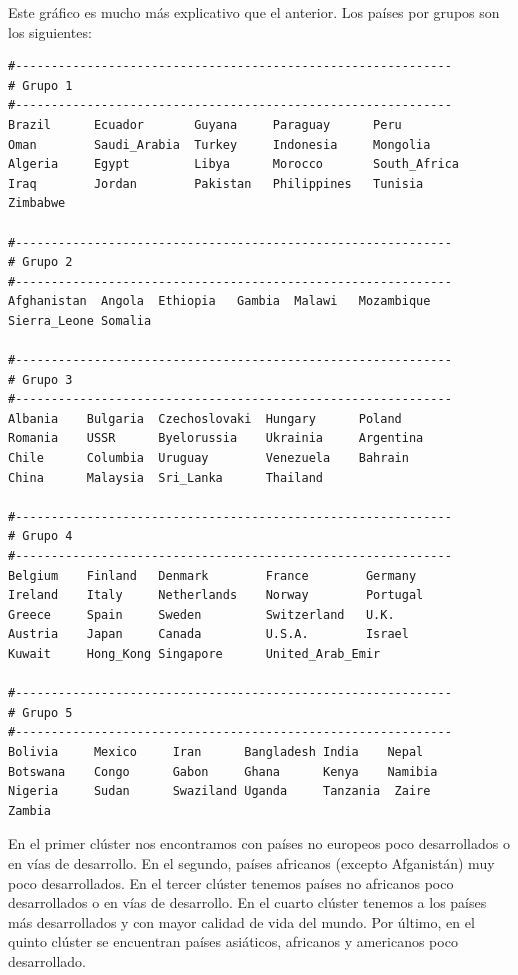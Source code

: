 \documentclass[12pt,a4paper,twoside,openright,titlepage,final]{article}
\begin{document}
Este gráfico es mucho más explicativo que el anterior. Los países por grupos son los siguientes:

\begin{verbatim}
#-------------------------------------------------------------
# Grupo 1
#-------------------------------------------------------------
Brazil      Ecuador       Guyana     Paraguay      Peru         
Oman        Saudi_Arabia  Turkey     Indonesia     Mongolia     
Algeria     Egypt         Libya      Morocco       South_Africa 
Iraq        Jordan        Pakistan   Philippines   Tunisia    
Zimbabwe 

#-------------------------------------------------------------
# Grupo 2
#-------------------------------------------------------------
Afghanistan  Angola  Ethiopia   Gambia  Malawi   Mozambique 
Sierra_Leone Somalia 

#-------------------------------------------------------------
# Grupo 3
#-------------------------------------------------------------
Albania    Bulgaria  Czechoslovaki  Hungary      Poland       
Romania    USSR      Byelorussia    Ukrainia     Argentina         
Chile      Columbia  Uruguay        Venezuela    Bahrain         
China      Malaysia  Sri_Lanka      Thailand 

#-------------------------------------------------------------
# Grupo 4
#-------------------------------------------------------------
Belgium    Finland   Denmark        France        Germany           
Ireland    Italy     Netherlands    Norway        Portugal            
Greece     Spain     Sweden         Switzerland   U.K.          
Austria    Japan     Canada         U.S.A.        Israel           
Kuwait     Hong_Kong Singapore      United_Arab_Emir 

#-------------------------------------------------------------
# Grupo 5
#-------------------------------------------------------------
Bolivia     Mexico     Iran      Bangladesh India    Nepal   
Botswana    Congo      Gabon     Ghana      Kenya    Namibia    
Nigeria     Sudan      Swaziland Uganda     Tanzania  Zaire 
Zambia 
\end{verbatim}

En el primer clúster nos encontramos con países no europeos poco desarrollados o en vías de desarrollo. En el segundo, países africanos (excepto Afganistán) muy poco desarrollados. En el tercer clúster tenemos países no africanos poco desarrollados o en vías de desarrollo. En el cuarto clúster tenemos a los países más desarrollados y con mayor calidad de vida del mundo. Por último, en el quinto clúster se encuentran países asiáticos, africanos y americanos poco desarrollado.
\end{document}

